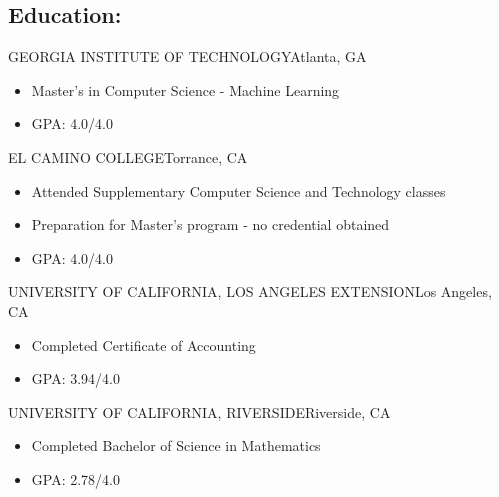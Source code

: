 \documentclass[11pt]{res}%
\begin{document}
\begin{resume}
\section{Education:}%
\label{sec:Education}%
\vspace*{0.03\textwidth}%
\begin{adjustwidth}{0.05\textwidth}{0.0\textwidth}
GEORGIA INSTITUTE OF TECHNOLOGY\hfill Atlanta, GA
\vspace*{-0.010000\textwidth}
\begin{itemize}%
\setlength\itemsep{-0.2em}%
\item%
Master's in Computer Science {-} Machine Learning%
\item%
GPA: 4.0/4.0%
\end{itemize}
\end{adjustwidth}%
\begin{adjustwidth}{0.05\textwidth}{0.0\textwidth}
EL CAMINO COLLEGE\hfill Torrance, CA
\vspace*{-0.010000\textwidth}
\begin{itemize}%
\setlength\itemsep{-0.2em}%
\item%
Attended Supplementary Computer Science and Technology classes%
\item%
Preparation for Master's program {-} no credential obtained%
\item%
GPA: 4.0/4.0%
\end{itemize}
\end{adjustwidth}%
\begin{adjustwidth}{0.05\textwidth}{0.0\textwidth}
UNIVERSITY OF CALIFORNIA, LOS ANGELES EXTENSION\hfill Los Angeles, CA
\vspace*{-0.010000\textwidth}
\begin{itemize}%
\setlength\itemsep{-0.2em}%
\item%
Completed Certificate of Accounting%
\item%
GPA: 3.94/4.0%
\end{itemize}
\end{adjustwidth}%
\begin{adjustwidth}{0.05\textwidth}{0.0\textwidth}
UNIVERSITY OF CALIFORNIA, RIVERSIDE\hfill Riverside, CA
\vspace*{-0.010000\textwidth}
\begin{itemize}%
\setlength\itemsep{-0.2em}%
\item%
Completed Bachelor of Science in Mathematics%
\item%
GPA: 2.78/4.0%
\end{itemize}
\end{adjustwidth}



\end{resume}
\end{document}
